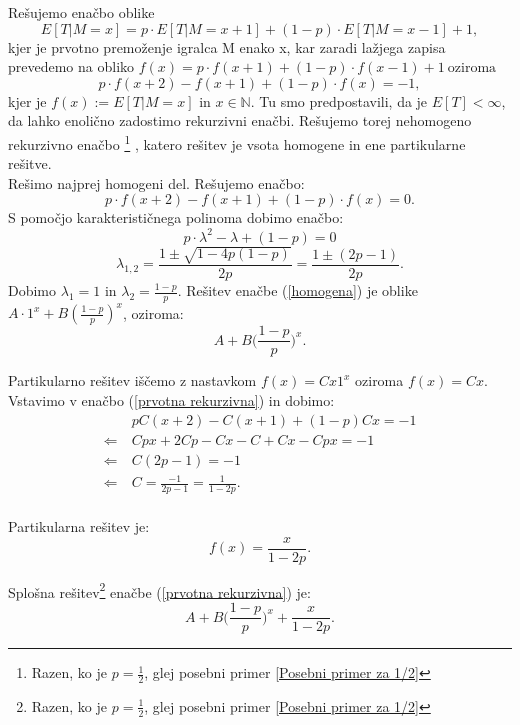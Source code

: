 \documentclass[12pt, a4paper]{article}
\begin{document}
Rešujemo enačbo oblike $$E[T|M=x] = p\cdot E[T|M=x+1] + (1-p)\cdot E[T|M=x-1] + 1,$$ kjer je prvotno premoženje igralca M enako x, kar zaradi lažjega zapisa prevedemo na obliko $f(x) = p\cdot f(x+1) + (1-p) \cdot f(x-1) + 1 ~ \textrm{oziroma} $ 
\begin{equation}
\label{prvotna rekurzivna}
p\cdot f(x+2) - f(x+1) + (1-p)\cdot f(x) = -1,
\end{equation}
kjer je $f(x):=E[T|M=x]$ in $x \in \mathbb{N}$. Tu smo predpostavili, da je $E[T] < \infty$, da lahko enolično zadostimo rekurzivni enačbi. 
Rešujemo torej nehomogeno rekurzivno enačbo \footnote{Razen, ko je $p=\frac{1}{2}$, glej posebni primer \ref{Posebni primer za 1/2} } , katero rešitev je vsota homogene in ene partikularne rešitve. \\

Rešimo najprej homogeni del. Rešujemo enačbo: 
\begin{equation}
\label{homogena}
p\cdot f(x+2) - f(x+1) + (1-p)\cdot f(x) = 0.
\end{equation}
S pomočjo karakterističnega polinoma dobimo enačbo: $$p\cdot  \lambda ^2 - \lambda + (1-p) = 0$$ $$\lambda _{1, 2}= \frac{1 \pm \sqrt{1 - 4p(1-p)}}{2p} = \frac{1 \pm (2p-1)}{2p}.$$
Dobimo $\lambda _{1} = 1$ in $\lambda _{2} = \frac{1-p}{p}$. Rešitev enačbe (\ref{homogena}) je oblike $A\cdot 1^x + B(\frac{1-p}{p})^x$, oziroma: $$A+ B \bigg( \frac{1-p}{p} \bigg )^x. $$

Partikularno rešitev iščemo z nastavkom $f(x)= Cx1^x$ oziroma $f(x)= Cx$. Vstavimo v enačbo (\ref{prvotna rekurzivna}) in dobimo: 
\begin{equation*}
\begin{split}
 &~pC(x+2)-C(x+1)+(1-p)Cx=-1\\
\Leftarrow & ~Cpx+2Cp-Cx-C+Cx-Cpx=-1 \\
\Leftarrow & ~C(2p-1)=-1\\
\Leftarrow & ~C=\frac{-1}{2p-1} = \frac{1}{1-2p}.\\
\end{split}
\end{equation*}
 
Partikularna rešitev je: $$f(x)=\frac{x}{1-2p}.$$

Splošna rešitev\footnote{Razen, ko je $p=\frac{1}{2}$, glej posebni primer \ref{Posebni primer za 1/2} } enačbe (\ref{prvotna rekurzivna}) je: $$A + B\bigg( \frac{1-p}{p} \bigg )^x+\frac{x}{1-2p}.$$
\end{document}
